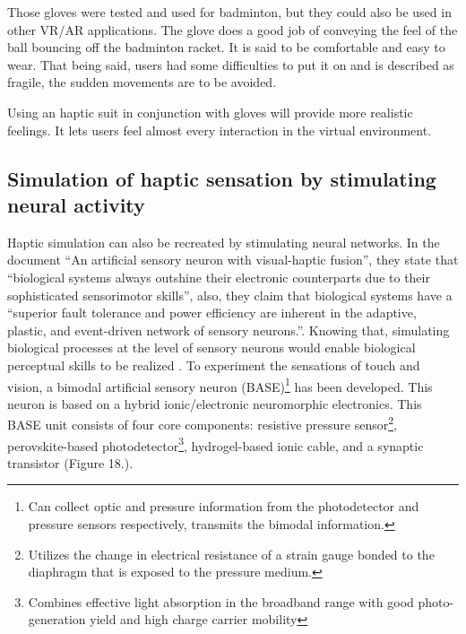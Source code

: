 \documentclass[12pt, a4paper]{article}
\begin{document}
\begin{multicols}{2}
Those gloves were tested and used for badminton, but they could also be used in other VR/AR applications. The glove does a good job of conveying the feel of the ball bouncing off the badminton racket. It is said to be comfortable and easy to wear. That being said, users had some difficulties to put it on and is described as fragile, the sudden movements are to be avoided\cite{hapticglove1}.

Using an haptic suit in conjunction with gloves will provide more realistic feelings. It lets users feel almost every interaction in the virtual environment.

\subsection{Simulation of haptic sensation by stimulating neural activity}

Haptic simulation can also be recreated by stimulating neural networks. In the document “An artificial sensory neuron with visual-haptic fusion”, they state that “biological systems always outshine their electronic counterparts due to their sophisticated sensorimotor skills”, also, they claim that biological systems have a “superior fault tolerance and power efficiency are inherent in the adaptive, plastic, and event-driven network of sensory neurons.”. Knowing that, simulating biological processes at the level of sensory neurons would enable biological perceptual skills to be realized \cite{neural-haptic}.
To experiment the sensations of touch and vision, a bimodal artificial sensory neuron (BASE)\footnote{Can collect optic and pressure information from the photodetector and pressure sensors respectively, transmits the bimodal information.} has been developed. This neuron is based on a hybrid ionic/electronic neuromorphic electronics. This BASE unit consists of four core components: resistive pressure sensor\footnote{Utilizes the change in electrical resistance of a strain gauge bonded to the diaphragm that is exposed to the pressure medium.}, perovskite-based photodetector\footnote{Combines effective light absorption in the broadband range with good photo-generation yield and high charge carrier mobility}, hydrogel-based ionic cable, and a synaptic transistor (Figure 18.).


\end{multicols}
\end{document}
